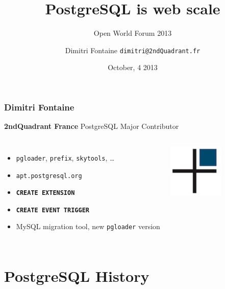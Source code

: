 \documentclass{beamer}
\title{PostgreSQL is web scale}
\subtitle{Open World Forum 2013}
\author{Dimitri Fontaine \texttt{dimitri@2ndQuadrant.fr}}
\date{October, 4 2013}
\begin{document}
\frame{\titlepage}

\begin{frame}[fragile]
  \frametitle{Dimitri Fontaine}

  \begin{center}
    \textbf{2ndQuadrant France}
    \linebreak
    PostgreSQL Major Contributor
  \end{center}
  \vfill

\begin{columns}[c]

  \begin{itemize}
   \item<1-> \texttt{pgloader}, \texttt{prefix}, \texttt{skytools}, …
   \item<1-> \texttt{apt.postgresql.org}
   \item<2-> \texttt{\textbf{CREATE EXTENSION}}
   \item<2-> \texttt{\textbf{CREATE EVENT TRIGGER}}
   \item<3-> MySQL migration tool, new \texttt{pgloader} version
  \end{itemize}  

\begin{center}
  \includegraphics[height=7em]{2ndQuadrant-cross.png}
\end{center}
\end{columns}
\end{frame}

\section{PostgreSQL History}


\end{document}
